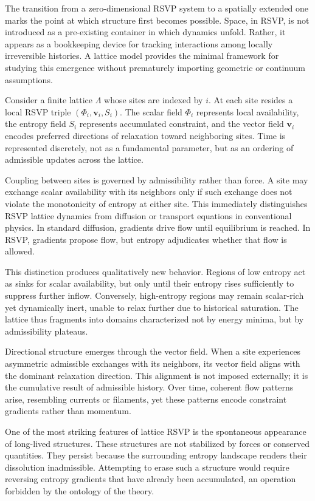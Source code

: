 \documentclass[11pt,oneside]{book}
\begin{document}
The transition from a zero-dimensional RSVP system to a spatially extended one marks the point at which structure first becomes possible. Space, in RSVP, is not introduced as a pre-existing container in which dynamics unfold. Rather, it appears as a bookkeeping device for tracking interactions among locally irreversible histories. A lattice model provides the minimal framework for studying this emergence without prematurely importing geometric or continuum assumptions.

Consider a finite lattice \(\Lambda\) whose sites are indexed by \(i\). At each site resides a local RSVP triple \((\Phi_i, \mathbf{v}_i, S_i)\). The scalar field \(\Phi_i\) represents local availability, the entropy field \(S_i\) represents accumulated constraint, and the vector field \(\mathbf{v}_i\) encodes preferred directions of relaxation toward neighboring sites. Time is represented discretely, not as a fundamental parameter, but as an ordering of admissible updates across the lattice.

Coupling between sites is governed by admissibility rather than force. A site may exchange scalar availability with its neighbors only if such exchange does not violate the monotonicity of entropy at either site. This immediately distinguishes RSVP lattice dynamics from diffusion or transport equations in conventional physics. In standard diffusion, gradients drive flow until equilibrium is reached. In RSVP, gradients propose flow, but entropy adjudicates whether that flow is allowed.

This distinction produces qualitatively new behavior. Regions of low entropy act as sinks for scalar availability, but only until their entropy rises sufficiently to suppress further inflow. Conversely, high-entropy regions may remain scalar-rich yet dynamically inert, unable to relax further due to historical saturation. The lattice thus fragments into domains characterized not by energy minima, but by admissibility plateaus.

Directional structure emerges through the vector field. When a site experiences asymmetric admissible exchanges with its neighbors, its vector field aligns with the dominant relaxation direction. This alignment is not imposed externally; it is the cumulative result of admissible history. Over time, coherent flow patterns arise, resembling currents or filaments, yet these patterns encode constraint gradients rather than momentum.

One of the most striking features of lattice RSVP is the spontaneous appearance of long-lived structures. These structures are not stabilized by forces or conserved quantities. They persist because the surrounding entropy landscape renders their dissolution inadmissible. Attempting to erase such a structure would require reversing entropy gradients that have already been accumulated, an operation forbidden by the ontology of the theory.
\end{document}
